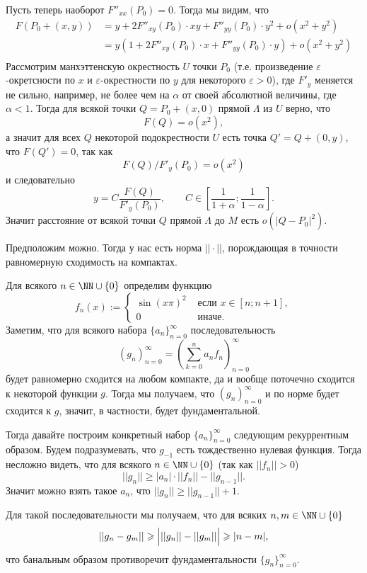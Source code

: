 \documentclass[12pt,a4paper]{article}
\begin{document}
\begin{enumproblem}
        Пусть теперь наоборот $F''_{xx}(P_0) = 0$. Тогда мы видим, что
        \begin{align*}
            F(P_0 + (x, y))
            &= y + 2 F''_{xy}(P_0) \cdot xy + F''_{yy}(P_0) \cdot y^2 + o(x^2 + y^2)\\
            &= y(1 + 2 F''_{xy}(P_0) \cdot x + F''_{yy}(P_0) \cdot y) + o(x^2 + y^2)\\
        \end{align*}
        Рассмотрим манхэттенскую окрестность $U$ точки $P_0$ (т.е. произведение $\varepsilon$-окретсности по $x$ и $\varepsilon$-окрестности по $y$ для некоторого $\varepsilon > 0$), где $F'_{y}$ меняется не сильно, например, не более чем на $\alpha$ от своей абсолютной величины, где $\alpha < 1$. Тогда для всякой точки $Q = P_0 + (x, 0)$ прямой $\Lambda$ из $U$ верно, что
        \[F(Q) = o(x^2),\]
        а значит для всех $Q$ некоторой подокрестности $U$ есть точка $Q' = Q + (0, y)$, что $F(Q') = 0$, так как
        \[F(Q) / F'_y(P_0) = o(x^2)\]
        и следовательно
        \[
            y = C \frac{F(Q)}{F'_y(P_0)},
            \qquad
            C \in \left[\frac{1}{1 + \alpha}; \frac{1}{1 - \alpha}\right].
        \]
        Значит расстояние от всякой точки $Q$ прямой $\Lambda$ до $M$ есть $o(|Q - P_0|^2)$.
    \end{enumproblem}

    \begin{enumproblem}
        Предположим можно. Тогда у нас есть норма $||\cdot||$, порождающая в точности равномерную сходимость на компактах.

        Для всякого $n \in \NN \cup \{0\}$ определим функцию
        \[
            f_n(x) :=
            \begin{cases}
                \sin(x \pi)^2& \text{ если } x \in [n; n+1],\\
                0& \text{ иначе.}
            \end{cases}
        \]
        Заметим, что для всякого набора $\{a_n\}_{n=0}^\infty$ последовательность
        \[
            (g_n)_{n=0}^\infty
            = \left(\sum_{k=0}^n a_n f_n\right)_{n=0}^\infty
        \]
        будет равномерно сходится на любом компакте, да и вообще поточечно сходится к некоторой функции $g$. Тогда мы получаем, что $(g_n)_{n=0}^\infty$ и по норме будет сходится к $g$, значит, в частности, будет фундаментальной.

        Тогда давайте построим конкретный набор $\{a_n\}_{n=0}^\infty$ следующим рекуррентным образом. Будем подразумевать, что $g_{-1}$ есть тождественно нулевая функция. Тогда несложно видеть, что для всякого $n \in \NN \cup \{0\}$ (так как $||f_n|| > 0$)
        \[||g_n|| \geqslant |a_n| \cdot ||f_n|| - ||g_{n-1}||.\]
        Значит можно взять такое $a_n$, что $||g_n|| \geqslant ||g_{n-1}|| + 1$.

        Для такой последовательности мы получаем, что для всяких $n, m \in \NN \cup \{0\}$
        \[||g_n - g_m|| \geqslant \Bigl| ||g_n|| - ||g_m|| \Bigr| \geqslant |n - m|,\]
        что банальным образом противоречит фундаментальности $\{g_n\}_{n=0}^\infty$.
    \end{enumproblem}
\end{document}
